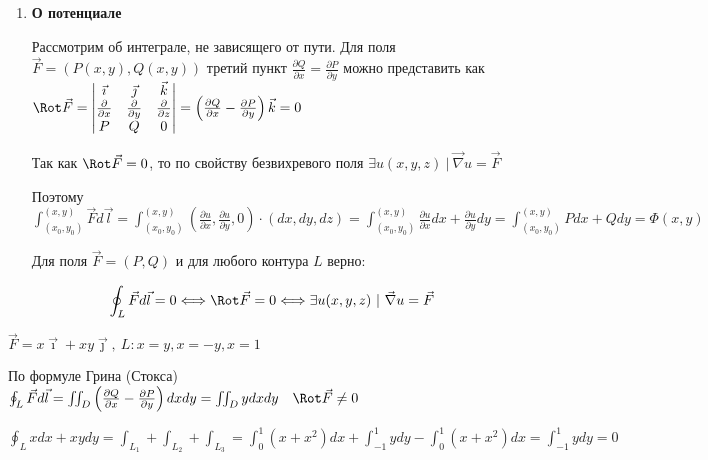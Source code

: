 \documentclass[12pt]{article}
\begin{document}
\begin{enumerate}[label*=\textbf{\arabic**} ]
        \mediumvspace

        \hypertarget{theoremaboutpotentialinvectorform}{}

        \item \textbf{\Ths О потенциале}

        Рассмотрим \Ths об интеграле, не зависящего от пути. Для поля $\vec F = (P(x, y), Q(x, y))$ третий пункт $\frac{\partial Q}{\partial x} = \frac{\partial P}{\partial y}$ можно представить как $\Rot \vec F = 
        \begin{vmatrix}
            \vec\imath & \vec\jmath & \vec k \\
            \frac{\partial}{\partial x} & \frac{\partial}{\partial y} & \frac{\partial}{\partial z} \\
            P & Q & 0
        \end{vmatrix} = \left(\frac{\partial Q}{\partial x} - \frac{\partial P}{\partial y}\right) \vec k = 0$

        Так как $\Rot \vec F = 0$, то по свойству безвихревого поля $\exists u(x, y, z) \ | \ \vec\nabla u = \vec F$

        Поэтому $\int_{(x_0, y_0)}^{(x, y)} \vec{F}d\vec{l} =  \int_{(x_0, y_0)}^{(x, y)} \left(\frac{\partial u}{\partial x}, \frac{\partial u}{\partial y}, 0\right) \cdot (dx, dy, dz) = \int_{(x_0, y_0)}^{(x, y)} \frac{\partial u}{\partial x} dx + \frac{\partial u}{\partial y} dy = \int_{(x_0, y_0)}^{(x, y)} Pdx + Qdy = \Phi(x, y)$

        \begin{MyTheorem}
             Для поля $\vec F = (P, Q)$ и для любого контура $L$ верно:

            \[\oint_L \vec{F}d\vec{l} = 0 \Longleftrightarrow \Rot \vec{F} = 0 \Longleftrightarrow \exists u(x, y, z) \ | \ \vec\nabla u = \vec{F}\]
        \end{MyTheorem}

    \end{enumerate}

    \Ex $\vec{F} = x\vec\imath + xy \vec\jmath, \ L: x = y, x = -y, x = 1$

    По формуле Грина (Стокса) $\oint_L \vec{F} d\vec{l} = \iint_{D} \left(\frac{\partial Q}{\partial x} - \frac{\partial P}{\partial y}\right) dxdy =
    \iint_D y dxdy \quad \Rot \vec{F} \neq 0$

    $\oint_L xdx + xydy = \int_{L_1} + \int_{L_2} + \int_{L_3} = \int_0^1 (x + x^2) dx + \int_{-1}^1 y dy - \int_0^1 (x + x^2) dx = \int_{-1}^1 y dy = 0$
\end{document}
